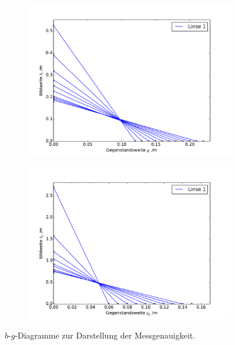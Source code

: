 \begin{figure}[hb] %
	\centering
	\begin{subfigure}{0.9\textwidth}
	\includegraphics[width=\textwidth]{Bilder/Messung1.pdf}
	\end{subfigure}
	\begin{subfigure}{0.9\textwidth}
	\includegraphics[width=\textwidth]{Bilder/Messung2.pdf}
	\end{subfigure}
	\caption{$b$-$g$-Diagramme zur Darstellung der Messgenauigkeit.}
	\label{fig:bgdiagramm} 
\end{figure}


